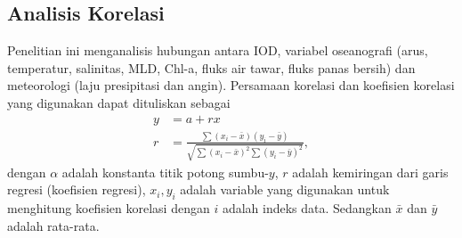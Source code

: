 \begin{spacing}{1.5}

	\subsection[Analisis Korelasi]{Analisis Korelasi}
		Penelitian ini menganalisis hubungan antara IOD, variabel oseanografi (arus, temperatur, salinitas, MLD, Chl-a, fluks air tawar, fluks panas bersih) dan meteorologi (laju presipitasi dan angin). Persamaan korelasi dan koefisien korelasi yang digunakan dapat dituliskan sebagai \cite{hidayat2023relationship,Haditiar2020}
		\begin{equation}
			\begin{aligned}
				y &= a+rx\\
				r &= \frac{\sum (x_i - \bar{x})(y_i - \bar{y})}{\sqrt{\sum (x_i-\bar{x})^2\sum (y_i-\bar{y})^2}},
			\end{aligned}
		\end{equation}
		dengan $\alpha$ adalah konstanta titik potong sumbu-$y$, $r$ adalah kemiringan dari garis regresi (koefisien regresi), $x_i, y_i$ adalah variable yang digunakan untuk menghitung koefisien korelasi dengan $i$ adalah indeks data. Sedangkan $\bar{x}$ dan $\bar{y}$ adalah rata-rata. 
		
\end{spacing}
\vspace{-0.5pc}
